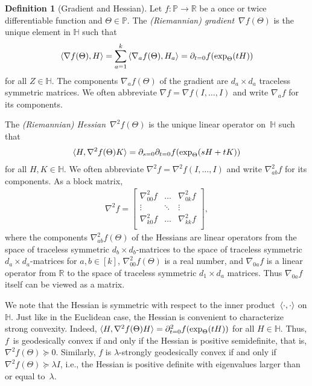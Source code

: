 \documentclass[aos]{imsart}
\theoremstyle{definition}
\newtheorem{definition}[theorem]{Definition}
\numberwithin{equation}{section}
\newcommand{\R}{{\mathbb{R}}}
\renewcommand{\P}{{\mathbb{P}}}
\renewcommand{\H}{{\mathbb{H}}}
\begin{document}
\begin{definition}[Gradient and Hessian]
Let $f\colon \P \to \R$ be a once or twice differentiable function and $\Theta \in \P$.
The \emph{(Riemannian) gradient}~$\nabla f(\Theta)$ is the unique element in $\H$ such that
\begin{align*}
  \braket{\nabla f(\Theta), H} = \sum_{a=1}^k \braket{\nabla_a f(\Theta), H_a} = \partial_{t=0} f(\exp_\Theta(tH))
\end{align*}
for all $Z\in \H$.
The components $\nabla_a f(\Theta)$ of the gradient are $d_a \times d_a$ traceless symmetric matrices.
We often abbreviate $\nabla f = \nabla f(I,\dots,I)$ and write $\nabla_a f$ for its components.

The \emph{(Riemannian) Hessian}~$\nabla^2 f(\Theta)$ is the unique linear operator on~$\H$ such that
\begin{align*}
  \braket{H, \nabla^2 f(\Theta) K}
= \partial_{s=0} \partial_{t=0} f(\exp_{\Theta}(sH + tK))
\end{align*}
for all $H,K \in \H$.
We often abbreviate $\nabla^2 f = \nabla^2 f(I,\dots,I)$ and write $\nabla^2_{ab}f$ for its components.
As a block matrix,
\begin{align*}
  \nabla^2 f = \begin{bmatrix}
  \nabla_{00}^2 f & \dots & \nabla_{0k}^2 f \\
  \vdots & \ddots & \vdots \\
  \nabla_{k0}^2 f & \dots & \nabla_{kk}^2 f \\
  \end{bmatrix},
\end{align*}
where the components $\nabla_{ab}^2f(\Theta)$ of the Hessians are linear operators from the space of traceless symmetric $d_b\times d_b$-matrices to the space of traceless symmetric $d_a \times d_a$-matrices for $a, b \in [k]$, $\nabla^2_{00} f(\Theta)$ is a real number, and $\nabla_{0a}f$ is a linear operator from $\R$ to the space of traceless symmetric $d_1\times d_a$ matrices. Thus $\nabla_{0a}f$ itself can be viewed as a matrix.
\end{definition}

We note that the Hessian is symmetric with respect to the inner product~$\braket{\cdot,\cdot}$ on $\H$.
Just like in the Euclidean case, the Hessian is convenient to characterize strong convexity.
Indeed, $\braket{H, \nabla^2 f(\Theta) H} = \partial^2_{t=0} f(\exp_{\Theta}(tH))$ for all $H\in \H$.
Thus, $f$~is geodesically convex if and only if the Hessian is positive semidefinite, that is, $\nabla^2 f(\Theta) \succeq 0$. %
Similarly, $f$ is $\lambda$-strongly geodesically convex if and only if~$\nabla^2 f(\Theta) \succeq \lambda I$, i.e., the Hessian is positive definite with eigenvalues larger than or equal to~$\lambda$.
\end{document}
